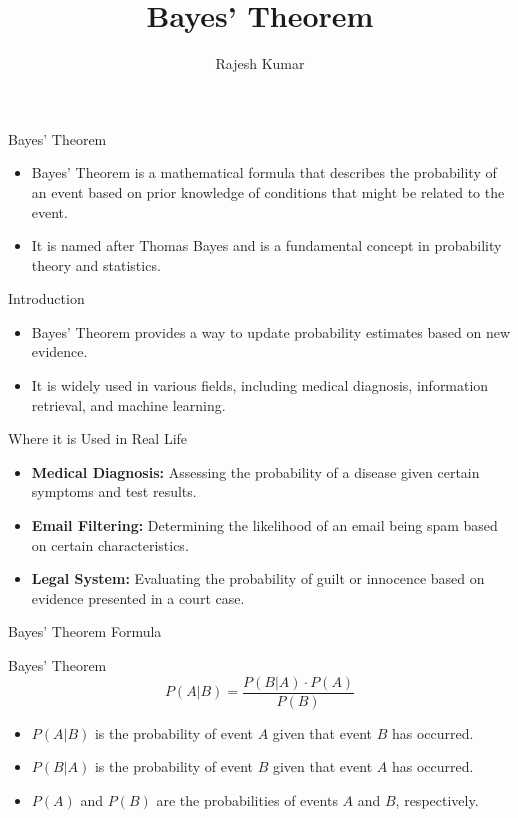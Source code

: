 \title{Bayes' Theorem}
\author{Rajesh Kumar}
\date{}

\begin{frame}
  \titlepage
\end{frame}

\begin{frame}{Bayes' Theorem}
  \begin{itemize}
    \item Bayes' Theorem is a mathematical formula that describes the probability of an event based on prior knowledge of conditions that might be related to the event.
    \item It is named after Thomas Bayes and is a fundamental concept in probability theory and statistics.
  \end{itemize}
\end{frame}

\begin{frame}{Introduction}
  \begin{itemize}
    \item Bayes' Theorem provides a way to update probability estimates based on new evidence.
    \item It is widely used in various fields, including medical diagnosis, information retrieval, and machine learning.
  \end{itemize}
\end{frame}

\begin{frame}{Where it is Used in Real Life}
  \begin{itemize}
    \item \textbf{Medical Diagnosis:} Assessing the probability of a disease given certain symptoms and test results.
    \item \textbf{Email Filtering:} Determining the likelihood of an email being spam based on certain characteristics.
    \item \textbf{Legal System:} Evaluating the probability of guilt or innocence based on evidence presented in a court case.
  \end{itemize}
\end{frame}

\begin{frame}{Bayes' Theorem Formula}
  \begin{block}{Bayes' Theorem}
    \[ P(A|B) = \frac{P(B|A) \cdot P(A)}{P(B)} \]
  \end{block}
  \begin{itemize}
    \item \( P(A|B) \) is the probability of event \( A \) given that event \( B \) has occurred.
    \item \( P(B|A) \) is the probability of event \( B \) given that event \( A \) has occurred.
    \item \( P(A) \) and \( P(B) \) are the probabilities of events \( A \) and \( B \), respectively.
  \end{itemize}
\end{frame}


